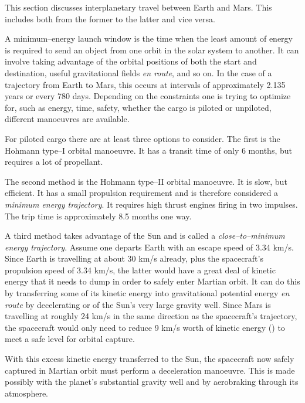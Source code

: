 

This section discusses interplanetary travel between Earth and Mars. This includes both from the former to the latter and vice versa.

A minimum--energy launch window is the time when the least amount of energy is required to send an object from one orbit in the solar system to another. It can involve taking advantage of the orbital positions of both the start and destination, useful gravitational fields {\it en route}, and so on. In the case of a trajectory from Earth to Mars, this occurs at intervals of approximately 2.135 years or every 780 days. Depending on the constraints one is trying to optimize for, such as energy, time, safety, whether the cargo is piloted or unpiloted, different manoeuvres are available.

For piloted cargo there are at least three options to consider. The first is the Hohmann type--I orbital manoeuvre. It has a transit time of only 6 months, but requires a lot of propellant.

The second method is the Hohmann type--II orbital manoeuvre. It is slow, but efficient. It has a small propulsion requirement and is therefore considered a {\it minimum energy trajectory}. It requires high thrust engines firing in two impulses. The trip time is approximately 8.5 months one way.

A third method takes advantage of the Sun and is called a {\it close--to--minimum energy trajectory}. Assume one departs Earth with an escape speed of 3.34 km/s. Since Earth is travelling at about 30 km/s already, plus the spacecraft's propulsion speed of 3.34 km/s, the latter would have a great deal of kinetic energy that it needs to dump in order to safely enter Martian orbit. It can do this by transferring some of its kinetic energy into gravitational potential energy {\it en route} by decelerating or  of the Sun's very large gravity well. Since Mars is travelling at roughly 24 km/s in the same direction as the spacecraft's trajectory, the spacecraft would only need to reduce 9 km/s worth of kinetic energy () to meet a safe level for orbital capture.

With this excess kinetic energy transferred to the Sun, the spacecraft now safely captured in Martian orbit must perform a deceleration manoeuvre. This is made possibly with the planet's substantial gravity well and by aerobraking through its atmosphere. 

